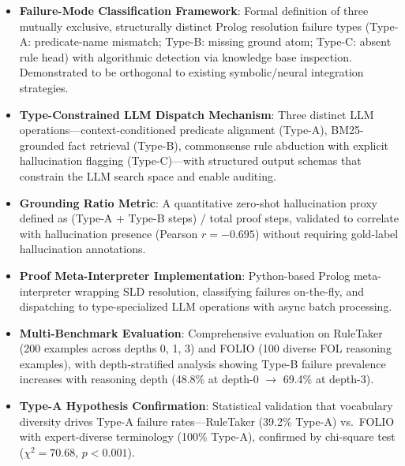 \documentclass[11pt,letterpaper]{article}
\begin{document}
\begin{itemize}
  \item \textbf{Failure-Mode Classification Framework}: Formal definition of three mutually exclusive, structurally distinct Prolog resolution failure types (Type-A: predicate-name mismatch; Type-B: missing ground atom; Type-C: absent rule head) with algorithmic detection via knowledge base inspection. Demonstrated to be orthogonal to existing symbolic/neural integration strategies.

  \item \textbf{Type-Constrained LLM Dispatch Mechanism}: Three distinct LLM operations---context-conditioned predicate alignment (Type-A), BM25-grounded fact retrieval (Type-B), commonsense rule abduction with explicit hallucination flagging (Type-C)---with structured output schemas that constrain the LLM search space and enable auditing.

  \item \textbf{Grounding Ratio Metric}: A quantitative zero-shot hallucination proxy defined as (Type-A + Type-B steps) / total proof steps, validated to correlate with hallucination presence (Pearson $r = -0.695$) without requiring gold-label hallucination annotations.

  \item \textbf{Proof Meta-Interpreter Implementation}: Python-based Prolog meta-interpreter wrapping SLD resolution, classifying failures on-the-fly, and dispatching to type-specialized LLM operations with async batch processing.

  \item \textbf{Multi-Benchmark Evaluation}: Comprehensive evaluation on RuleTaker (200 examples across depths 0, 1, 3) and FOLIO (100 diverse FOL reasoning examples), with depth-stratified analysis showing Type-B failure prevalence increases with reasoning depth (48.8\% at depth-0 $\to$ 69.4\% at depth-3).

  \item \textbf{Type-A Hypothesis Confirmation}: Statistical validation that vocabulary diversity drives Type-A failure rates---RuleTaker (39.2\% Type-A) vs.\ FOLIO with expert-diverse terminology (100\% Type-A), confirmed by chi-square test ($\chi^2 = 70.68$, $p{<}0.001$).
\end{itemize}
\end{document}
